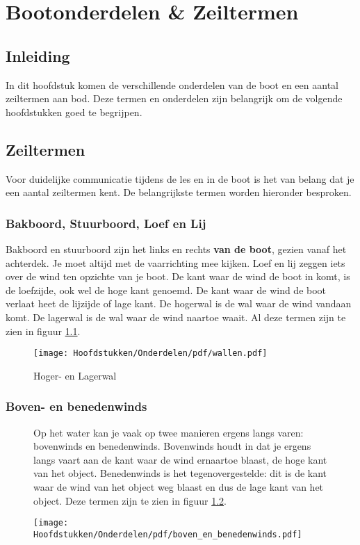 \chapter{Bootonderdelen \& Zeiltermen}
\section{Inleiding}
In dit hoofdstuk komen de verschillende onderdelen van de boot en een aantal zeiltermen aan bod. Deze termen en onderdelen zijn belangrijk om de volgende hoofdstukken goed te begrijpen.

\section{Zeiltermen}
Voor duidelijke communicatie tijdens de les en in de boot is het van belang dat je een aantal zeiltermen kent. De belangrijkste termen worden hieronder besproken.

\subsection{Bakboord, Stuurboord, Loef en Lij}
Bakboord en stuurboord zijn het links en rechts \textbf{van de boot}, gezien vanaf het achterdek. Je moet altijd met de vaarrichting mee kijken. Loef en lij zeggen iets over de wind ten opzichte van je boot. De kant waar de wind de boot in komt, is de loefzijde, ook wel de hoge kant genoemd. De kant waar de wind de boot verlaat heet de lijzijde of lage kant. De hogerwal is de wal waar de wind vandaan komt. De lagerwal is de wal waar de wind naartoe waait. Al deze termen zijn te zien in figuur \ref{pic:hoog_laag}. 
\begin{figure}[ht]
	\centering
	\texttt{[image: Hoofdstukken/Onderdelen/pdf/wallen.pdf]}
	\caption{Hoger- en Lagerwal}
	\centering
	\label{pic:hoog_laag}
\end{figure}

\subsection{Boven- en benedenwinds}
\begin{figure}[H]
	\centering
	\begin{minipage}[t]{0.55\textwidth}
		\vspace{-4cm}
		Op het water kan je vaak op twee manieren ergens langs varen: bovenwinds en benedenwinds. Bovenwinds houdt in dat je ergens langs vaart aan de kant waar de wind ernaartoe blaast, de hoge kant van het object. Benedenwinds is het tegenovergestelde: dit is de kant waar de wind van het object weg blaast en dus de lage kant van het object. Deze termen zijn te zien in figuur \ref{pic:boven_benedenwinds}.
	\end{minipage}
	\hfill
	\begin{minipage}[b]{0.40\textwidth}
		\centering
		\texttt{[image: Hoofdstukken/Onderdelen/pdf/boven\_en\_benedenwinds.pdf]}
		\caption{}
		\centering
		\label{pic:boven_benedenwinds}
	\end{minipage}
\end{figure}

